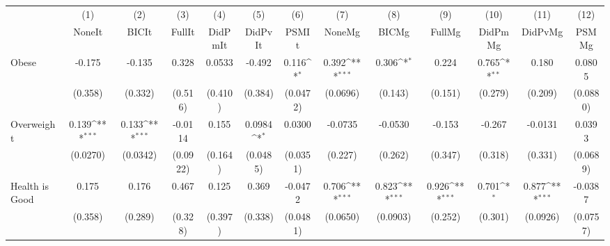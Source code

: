 {
\def\sym#1{\ifmmode^{#1}\else\(^{#1}\)\fi}
\begin{tabular}{l*{12}{c}}
\toprule
            &\multicolumn{1}{c}{(1)}&\multicolumn{1}{c}{(2)}&\multicolumn{1}{c}{(3)}&\multicolumn{1}{c}{(4)}&\multicolumn{1}{c}{(5)}&\multicolumn{1}{c}{(6)}&\multicolumn{1}{c}{(7)}&\multicolumn{1}{c}{(8)}&\multicolumn{1}{c}{(9)}&\multicolumn{1}{c}{(10)}&\multicolumn{1}{c}{(11)}&\multicolumn{1}{c}{(12)}\\
            &\multicolumn{1}{c}{NoneIt}&\multicolumn{1}{c}{BICIt}&\multicolumn{1}{c}{FullIt}&\multicolumn{1}{c}{DidPmIt}&\multicolumn{1}{c}{DidPvIt}&\multicolumn{1}{c}{PSMIt}&\multicolumn{1}{c}{NoneMg}&\multicolumn{1}{c}{BICMg}&\multicolumn{1}{c}{FullMg}&\multicolumn{1}{c}{DidPmMg}&\multicolumn{1}{c}{DidPvMg}&\multicolumn{1}{c}{PSMMg}\\
\midrule
Obese       &      -0.175         &      -0.135         &       0.328         &      0.0533         &      -0.492         &       0.116\sym{*}  &       0.392\sym{***}&       0.306\sym{*}  &       0.224         &       0.765\sym{**} &       0.180         &      0.0805         \\
            &     (0.358)         &     (0.332)         &     (0.516)         &     (0.410)         &     (0.384)         &    (0.0472)         &    (0.0696)         &     (0.143)         &     (0.151)         &     (0.279)         &     (0.209)         &    (0.0880)         \\
\addlinespace
Overweight  &       0.139\sym{***}&       0.133\sym{***}&     -0.0114         &       0.155         &      0.0984\sym{*}  &      0.0300         &     -0.0735         &     -0.0530         &      -0.153         &      -0.267         &     -0.0131         &      0.0393         \\
            &    (0.0270)         &    (0.0342)         &    (0.0922)         &     (0.164)         &    (0.0485)         &    (0.0351)         &     (0.227)         &     (0.262)         &     (0.347)         &     (0.318)         &     (0.331)         &    (0.0689)         \\
\addlinespace
Health is Good&       0.175         &       0.176         &       0.467         &       0.125         &       0.369         &     -0.0472         &       0.706\sym{***}&       0.823\sym{***}&       0.926\sym{***}&       0.701\sym{*}  &       0.877\sym{***}&     -0.0387         \\
            &     (0.358)         &     (0.289)         &     (0.328)         &     (0.397)         &     (0.338)         &    (0.0481)         &    (0.0650)         &    (0.0903)         &     (0.252)         &     (0.301)         &    (0.0926)         &    (0.0757)         \\

\end{tabular}}
